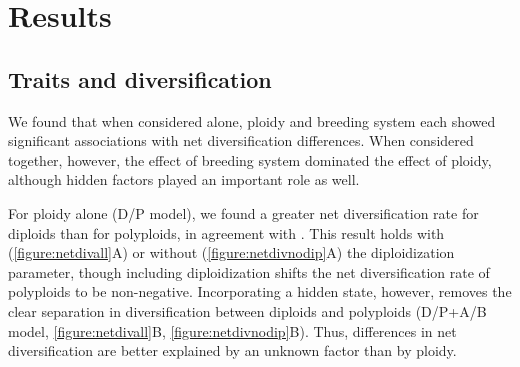 \section{Results}

\subsection{Traits and diversification}


We found that when considered alone, ploidy and breeding system each showed significant associations with net diversification differences. %
When considered together, however, the effect of breeding system dominated the effect of ploidy, although hidden factors played an important role as well. %

%
For ploidy alone (D/P model), we found a greater net diversification rate for diploids than for polyploids, in agreement with \citep{mayrose_2011, mayrose_2015}.
This result holds with (\cref{figure:netdivall}A) or without (\cref{figure:netdivnodip}A) the diploidization parameter, though including diploidization shifts the net diversification rate of polyploids to be non-negative.
Incorporating a hidden state, however, removes the clear separation in diversification between diploids and polyploids (D/P+A/B model, \cref{figure:netdivall}B, \cref{figure:netdivnodip}B).
Thus, differences in net diversification are better explained by an unknown factor than by ploidy.


